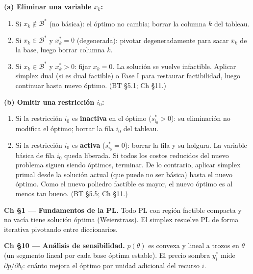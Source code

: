 \documentclass[12pt]{article}
\theoremstyle{plain}
\begin{document}
\begin{solucion}

\noindent\textbf{(a) Eliminar una variable $x_k$:}
\begin{enumerate}[label=\arabic*.]
      \item Si $x_k\notin\mathcal{B}^*$ (no básica): el óptimo no cambia; borrar la columna $k$ del tableau.
      \item Si $x_k\in\mathcal{B}^*$ y $x_k^*=0$ (degenerada): pivotar degeneradamente para sacar $x_k$ de la base, luego borrar columna $k$.
      \item Si $x_k\in\mathcal{B}^*$ y $x_k^*>0$: fijar $x_k=0$. La solución se vuelve infactible. Aplicar símplex dual (si es dual factible) o Fase I para restaurar factibilidad, luego continuar hasta nuevo óptimo. (BT §5.1; Ch §11.)
\end{enumerate}

\noindent\textbf{(b) Omitir una restricción $i_0$:}
\begin{enumerate}[label=\arabic*.]
      \item Si la restricción $i_0$ es \textbf{inactiva} en el óptimo ($s_{i_0}^*>0$): su eliminación no modifica el óptimo; borrar la fila $i_0$ del tableau.
      \item Si la restricción $i_0$ es \textbf{activa} ($s_{i_0}^*=0$): borrar la fila y su holgura. La variable básica de fila $i_0$ queda liberada. Si todos los costos reducidos del nuevo problema siguen siendo óptimos, terminar. De lo contrario, aplicar símplex primal desde la solución actual (que puede no ser básica) hasta el nuevo óptimo. Como el nuevo poliedro factible es mayor, el nuevo óptimo es al menos tan bueno. (BT §5.5; Ch §11.)
\end{enumerate}

\end{solucion}

\begin{teofund}
\textbf{Ch §1 — Fundamentos de la PL.} Todo PL con región factible compacta y no vacía tiene solución óptima (Weierstrass). El simplex resuelve PL de forma iterativa pivotando entre diccionarios.

\textbf{Ch §10 — Análisis de sensibilidad.} $p(\theta)$ es convexa y lineal a trozos en $\theta$ (un segmento lineal por cada base óptima estable). El precio sombra $y_i^*$ mide $\partial p/\partial b_i$: cuánto mejora el óptimo por unidad adicional del recurso $i$.
\end{teofund}

\bigskip
\end{document}
